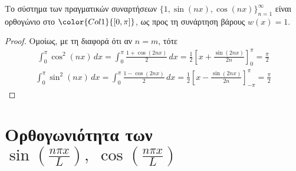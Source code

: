 \documentclass[a4paper,table]{report}
\begin{document}
\begin{prop}
  Το σύστημα των πραγματικών συναρτήσεων 
  $ \{ 1, \sin{(nx)}, \cos{(nx)} \}_{n=1}^{\infty} $ 
  είναι ορθογώνιο στο $ \color{Col1}{[0, \pi]} $, ως προς τη συνάρτηση βάρους 
  $ w(x)=1 $.
\end{prop}
\begin{proof}
  Ομοίως, με τη διαφορά ότι αν $ n=m $, τότε 
  \begin{align*}
    \int _{0}^{\pi} \cos^{2}(nx) \,{dx} = 
    \int _{0}^{\pi} \frac{1+ \cos{(2nx)}}{2} \,{dx} = 
    \frac{1}{2} \left[x + \frac{\sin{(2nx)}}{2n} \right]_{0}^{\pi} = \frac{\pi}{2}
  \end{align*}
  \begin{align*}
    \int _{0}^{\pi} \sin^{2}(nx) \,{dx} = 
    \int _{0}^{\pi} \frac{1- \cos{(2nx)}}{2} \,{dx} = 
    \frac{1}{2} \left[x - \frac{\sin{(2nx)}}{2n} \right]_{-\pi}^{\pi} = \frac{\pi}{2}
  \end{align*}
\end{proof}



\section*{Ορθογωνιότητα των \ensuremath{\sin{(\frac{n \pi x}{L})}, \; 
\cos{(\frac{n \pi x}{L})}}}
\end{document}
